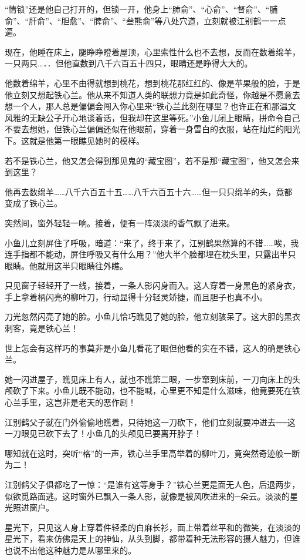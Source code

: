 \documentclass[12pt,oneside]{book}
\begin{document}
``情锁''还是他自己打开的，但锁一开，他身上``肺俞''、``心俞''、``督俞''、``脯俞''、``肝俞''、``胆愈''、``脾俞''、``叁熊俞''等八处穴道，立刻就被江别鹤一一点遍。

现在，他睡在床上，腿睁睁瞪着屋顶，心里索性什么也不去想，反而在数着绵羊，一只两只\ldots．．但他直数到八千六百五十四只，眼睛还是睁得大大的。

他数着绵羊，心里不由得就想到桃花，想到桃花那红红的、像是苹果般的脸，于是他立刻又想起铁心兰。他从来不知道人类的联想力竟是如此奇怪，你越是不愿意去想一个人，那人总是偏偏会闯入你心里来``铁心兰此刻在哪里？也许正在和那温文风雅的无缺公子开心地谈着话，但我却在这里等死。''小鱼儿闭上眼睛，拼命令自己不要去想她，但铁心兰偏偏还似在他眼前，穿着一身雪白的衣服，站在灿烂的阳光下。这就是他第一眼瞧见她时的模样。

若不是铁心兰，他又怎会得到那见鬼的``藏宝图''，若不是那``藏宝图''，他又怎会来到这里？

他再去数绵羊\ldots\ldots 八千六百五十五\ldots\ldots 八千六百五十六\ldots\ldots 但一只只绵羊的头，竟都变成了铁心兰。

突然间，窗外轻轻一响。接着，便有一阵淡淡的香气飘了进来。

小鱼儿立刻屏住了呼吸，暗道：``来了，终于来了，江别鹤果然算的不错\ldots\ldots 唉，我连手指都不能动，屏住呼吸又有什么用？''他大半个脸都埋在枕头里，只露出半只眼睛。他就用这半只眼睛往外瞧。

只见窗子轻轻开了一线，接着，一条人影闪身而入。这人穿着一身黑色的紧身衣，手上拿着柄闪亮的柳叶刀，行动显得十分轻灵矫捷，而且胆子也真不小。

刀光忽然闪亮了她的脸。小鱼儿恰巧瞧见了她的脸，他立刻骇呆了。这大胆的黑衣刺客，竟是铁心兰！

世上怎会有这样巧的事莫非是小鱼儿看花了眼但他看的实在不错，这人的确是铁心兰。

她一闪进屋子，瞧见床上有人，就也不瞧第二眼，一步窜到床前，一刀向床上的头颅砍了下来。小鱼儿既不能动，也不能喊，心里更不知是什么滋味，他竟要死在铁心兰手里，这岂非是老天的恶作剧！

江别鹤父子就在门外偷偷地瞧着，只待她这一刀砍下，他们立刻就要冲进去──这一刀眼见已砍下去了！小鱼几的头颅见已要离开脖子！

哪知就在这时，突听``格''的一声，铁心兰手里高举着的柳叶刀，竟突然奇迹般一断为二！

江别鹤父子俱都吃了一惊：``是谁有这等身手？''铁心兰更是面无人色，后退两步，似欲觅路面逃。这时窗外已飘入一条人影，就像是被风吹进来的─朵云。淡淡的星光照进窗户。

星光下，只见这人身上穿着件轻柔的白麻长衫，面上带着丝平和的微笑，在淡淡的星光下，看来仿佛是天上的神仙，从头到脚，都带着种无法形容的摄人魅力，但谁也说不出他这种魅力是从哪里来的。
\end{document}
